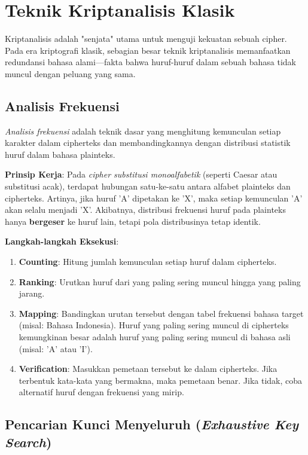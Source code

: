 \section{Teknik Kriptanalisis Klasik}

Kriptanalisis adalah "senjata" utama untuk menguji kekuatan sebuah cipher. Pada era kriptografi klasik, sebagian besar teknik kriptanalisis memanfaatkan redundansi bahasa alami—fakta bahwa huruf-huruf dalam sebuah bahasa tidak muncul dengan peluang yang sama.

\subsection{Analisis Frekuensi}

\textit{Analisis frekuensi} adalah teknik dasar yang menghitung kemunculan setiap karakter dalam cipherteks dan membandingkannya dengan distribusi statistik huruf dalam bahasa plainteks.

\textbf{Prinsip Kerja}:
Pada \textit{cipher substitusi monoalfabetik} (seperti Caesar atau substitusi acak), terdapat hubungan satu-ke-satu antara alfabet plainteks dan cipherteks. Artinya, jika huruf 'A' dipetakan ke 'X', maka setiap kemunculan 'A' akan selalu menjadi 'X'. Akibatnya, distribusi frekuensi huruf pada plainteks hanya \textbf{bergeser} ke huruf lain, tetapi pola distribusinya tetap identik.

\textbf{Langkah-langkah Eksekusi}:
\begin{enumerate}
    \item \textbf{Counting}: Hitung jumlah kemunculan setiap huruf dalam cipherteks.
    \item \textbf{Ranking}: Urutkan huruf dari yang paling sering muncul hingga yang paling jarang.
    \item \textbf{Mapping}: Bandingkan urutan tersebut dengan tabel frekuensi bahasa target (misal: Bahasa Indonesia). Huruf yang paling sering muncul di cipherteks kemungkinan besar adalah huruf yang paling sering muncul di bahasa asli (misal: 'A' atau 'I').
    \item \textbf{Verification}: Masukkan pemetaan tersebut ke dalam cipherteks. Jika terbentuk kata-kata yang bermakna, maka pemetaan benar. Jika tidak, coba alternatif huruf dengan frekuensi yang mirip.
\end{enumerate}

\subsection{Pencarian Kunci Menyeluruh (\textit{Exhaustive Key Search})}

